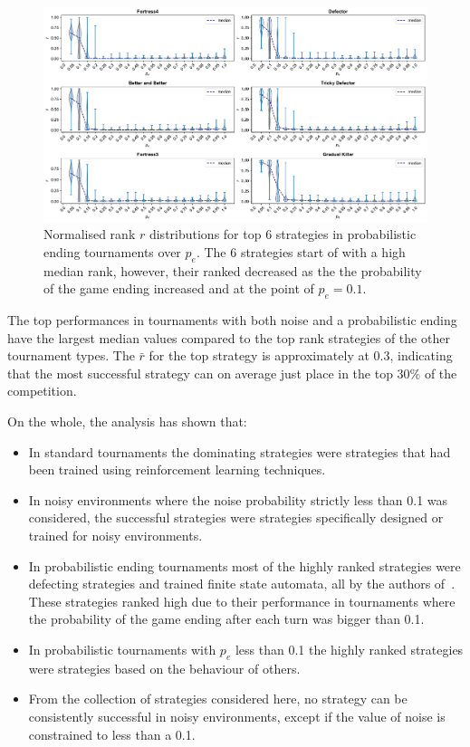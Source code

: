 \begin{figure}[!htbp]
    \centering
    \includegraphics[width=.92\textwidth]{../images/folk_theorem.pdf}
    \caption{Normalised rank \(r\) distributions for top 6 strategies in probabilistic ending tournaments
    over $p_e$. The 6 strategies start of with a high median rank,
    however, their ranked decreased as the the probability of the game ending
    increased and at the point of \(p_e = 0.1\).}
    \label{fig:effect_of_probend}
\end{figure}

The top performances in tournaments with both noise and a probabilistic ending
have the largest median values compared to the top rank strategies of the other
tournament types. The \(\bar{r}\) for the top strategy is approximately at 0.3,
indicating that the most successful strategy can on average just place in the
top 30\% of the competition.

On the whole, the analysis has shown that:

\begin{itemize}
    \item In standard tournaments the dominating strategies were
    strategies that had been trained using reinforcement learning techniques.
    \item In noisy environments where the noise probability strictly less than
    0.1 was considered, the successful strategies were strategies specifically
    designed or trained for noisy environments.
    \item In probabilistic ending tournaments most of the highly ranked
    strategies were defecting strategies and trained finite state automata, all
    by the authors of~\cite{Ashlock2006, Ashlock2014}. These strategies ranked
    high due to their performance in tournaments where the probability of the
    game ending after each turn was bigger than 0.1.
    \item In probabilistic tournaments with \(p_e\) less than 0.1 the highly
    ranked strategies were strategies based on the behaviour of others.
    \item From the collection of strategies considered here,  no strategy can be
    consistently successful in noisy environments, except if the value of noise
    is constrained to less than a 0.1.
\end{itemize}


